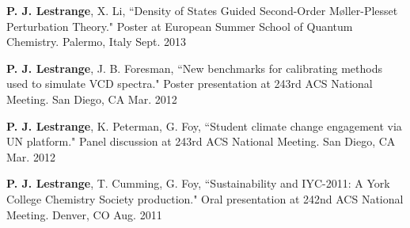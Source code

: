 \begin{cvpresentations}
\cvpresentation
{\textbf{P. J. Lestrange}, X. Li, ``Density of States Guided Second-Order M{\o}ller-Plesset Perturbation Theory." Poster at European Summer School of Quantum Chemistry.} %
{Palermo, Italy} %
{Sept. 2013} %


\cvpresentation
{\textbf{P. J. Lestrange}, J. B. Foresman, ``New benchmarks for calibrating methods used to simulate VCD spectra." Poster presentation at 243rd ACS National Meeting.} %
{San Diego, CA} %
{Mar. 2012} %


\cvpresentation
{\textbf{P. J. Lestrange}, K. Peterman, G. Foy, ``Student climate change engagement via UN platform." Panel discussion at 243rd ACS National Meeting.} %
{San Diego, CA} %
{Mar. 2012} %


\cvpresentation
{\textbf{P. J. Lestrange}, T. Cumming, G. Foy, ``Sustainability and IYC-2011: A York College Chemistry Society production." Oral presentation at 242nd ACS National Meeting.} %
{Denver, CO} %
{Aug. 2011} %


\end{cvpresentations}